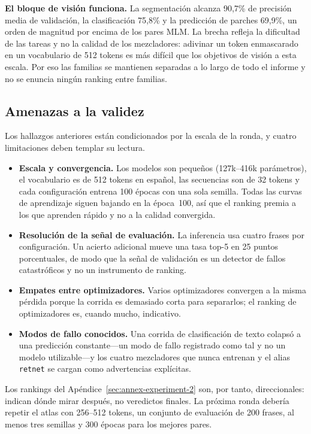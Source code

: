 \textbf{El bloque de visión funciona.} La segmentación alcanza 90,7\% de precisión media de validación, la clasificación 75,8\% y la predicción de parches 69,9\%, un orden de magnitud por encima de los pares MLM. La brecha refleja la dificultad de las tareas y no la calidad de los mezcladores: adivinar un token enmascarado en un vocabulario de 512 tokens es más difícil que los objetivos de visión a esta escala. Por eso las familias se mantienen separadas a lo largo de todo el informe y no se enuncia ningún ranking entre familias.

\subsection{Amenazas a la validez}

Los hallazgos anteriores están condicionados por la escala de la ronda, y cuatro limitaciones deben templar su lectura.

\begin{itemize}[leftmargin=*]
    \item \textbf{Escala y convergencia.} Los modelos son pequeños (127k--416k parámetros), el vocabulario es de 512 tokens en español, las secuencias son de 32 tokens y cada configuración entrena 100 épocas con una sola semilla. Todas las curvas de aprendizaje siguen bajando en la época~100, así que el ranking premia a los que aprenden rápido y no a la calidad convergida.
    \item \textbf{Resolución de la señal de evaluación.} La inferencia usa cuatro frases por configuración. Un acierto adicional mueve una tasa top-5 en 25 puntos porcentuales, de modo que la señal de validación es un detector de fallos catastróficos y no un instrumento de ranking.
    \item \textbf{Empates entre optimizadores.} Varios optimizadores convergen a la misma pérdida porque la corrida es demasiado corta para separarlos; el ranking de optimizadores es, cuando mucho, indicativo.
    \item \textbf{Modos de fallo conocidos.} Una corrida de clasificación de texto colapsó a una predicción constante---un modo de fallo registrado como tal y no un modelo utilizable---y los cuatro mezcladores que nunca entrenan y el alias \texttt{retnet} se cargan como advertencias explícitas.
\end{itemize}

Los rankings del Apéndice~\ref{sec:annex-experiment-2} son, por tanto, direccionales: indican dónde mirar después, no veredictos finales. La próxima ronda debería repetir el atlas con 256--512 tokens, un conjunto de evaluación de 200 frases, al menos tres semillas y 300 épocas para los mejores pares.
